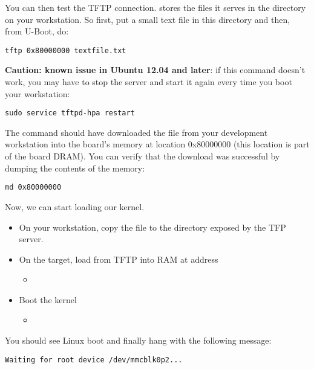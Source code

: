 You can then test the TFTP connection.  stores the files
it serves in the  directory on your
workstation. So first, put a small text file in this directory and
then, from U-Boot, do:

\begin{verbatim}
tftp 0x80000000 textfile.txt
\end{verbatim}

{\bf Caution: known issue in Ubuntu 12.04 and later}:
if this command doesn't work, you may have to stop the server
and start it again every time you boot your workstation:

\begin{verbatim}
sudo service tftpd-hpa restart
\end{verbatim}

The  command should have downloaded
the  file from your development
workstation into the board's memory at location 0x80000000 (this
location is part of the board DRAM). You can verify that the download
was successful by dumping the contents of the memory:

\begin{verbatim}
md 0x80000000
\end{verbatim}

Now, we can start loading our kernel.

\begin{itemize}
\item On your workstation, copy the file
   to the directory exposed by the
  TFP server.
\item On the target, load  from TFTP into RAM at address
  \begin{itemize}
  \item {}
  \end{itemize}
\item Boot the kernel
  \begin{itemize}
  \item {}
  \end{itemize}
\end{itemize}

You should see Linux boot and finally hang with the following message:

\begin{verbatim}
Waiting for root device /dev/mmcblk0p2...
\end{verbatim}

